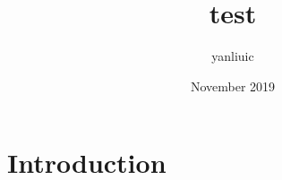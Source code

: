 \documentclass{article}
\title{test}
\author{yanliuic }
\date{November 2019}
\begin{document}
\maketitle

\section{Introduction}
\end{document}
